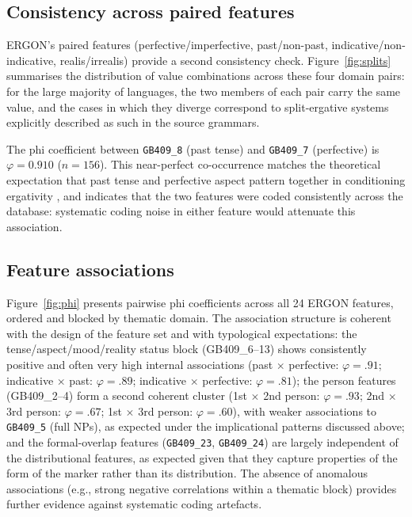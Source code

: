 \documentclass[12pt,a4paper]{article}
\newcommand{\feat}[1]{\texttt{#1}}
\begin{document}
\subsection{Consistency across paired features}

ERGON's paired features (perfective/imperfective, past/non-past, indicative/non-indicative, realis/irrealis) provide a second consistency check. Figure~\ref{fig:splits} summarises the distribution of value combinations across these four domain pairs: for the large majority of languages, the two members of each pair carry the same value, and the cases in which they diverge correspond to split-ergative systems explicitly described as such in the source grammars.

The phi coefficient between \feat{GB409\_8} (past tense) and \feat{GB409\_7} (perfective) is $\varphi = 0.910$ ($n = 156$). This near-perfect co-occurrence matches the theoretical expectation that past tense and perfective aspect pattern together in conditioning ergativity \cite{dixon1994,bybee1994}, and indicates that the two features were coded consistently across the database: systematic coding noise in either feature would attenuate this association.

\subsection{Feature associations}

Figure~\ref{fig:phi} presents pairwise phi coefficients across all 24 ERGON features, ordered and blocked by thematic domain. The association structure is coherent with the design of the feature set and with typological expectations: the tense/aspect/mood/reality status block (GB409\_6--13) shows consistently positive and often very high internal associations (past $\times$ perfective: $\varphi = .91$; indicative $\times$ past: $\varphi = .89$; indicative $\times$ perfective: $\varphi = .81$); the person features (GB409\_2--4) form a second coherent cluster (1st $\times$ 2nd person: $\varphi = .93$; 2nd $\times$ 3rd person: $\varphi = .67$; 1st $\times$ 3rd person: $\varphi = .60$), with weaker associations to \feat{GB409\_5} (full NPs), as expected under the implicational patterns discussed above; and the formal-overlap features (\feat{GB409\_23}, \feat{GB409\_24}) are largely independent of the distributional features, as expected given that they capture properties of the form of the marker rather than its distribution. The absence of anomalous associations (e.g., strong negative correlations within a thematic block) provides further evidence against systematic coding artefacts.
\end{document}
